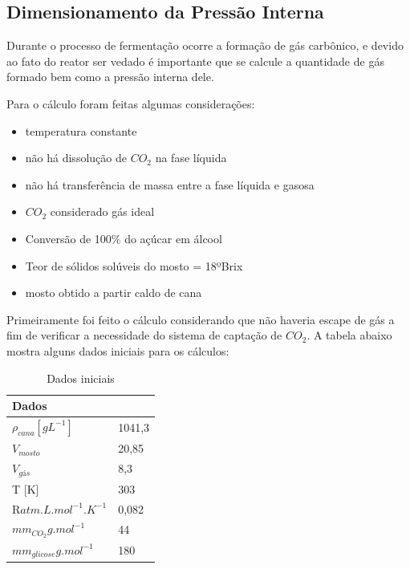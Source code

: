 \subsection{Dimensionamento da Pressão Interna}

Durante o processo de fermentação ocorre a formação de gás carbônico, e devido ao fato do reator ser vedado é importante que se calcule a quantidade de gás formado bem como a pressão interna dele.

Para o cálculo foram feitas algumas considerações:

\begin{itemize}
	\item temperatura constante
	\item não há dissolução de \(CO_{2}\) na fase líquida
	\item não há transferência de massa entre a fase líquida e gasosa
	\item \(CO_{2}\) considerado gás ideal
	\item Conversão de 100\% do açúcar em álcool
	\item Teor de sólidos solúveis do mosto = 18ºBrix
	\item mosto obtido a partir caldo de cana
\end{itemize}

Primeiramente foi feito o cálculo considerando que não haveria escape de gás a fim de verificar a necessidade do sistema de captação de \(CO_{2}\). A tabela abaixo mostra alguns dados iniciais para os cálculos:

\begin{table}[h]
\centering
\begin{tabular}{|l|l|}
\hline
\multicolumn{2}{|l|}{Dados} \\ \hline
\(\rho_{cana}[gL^{-1}]\)             &    1041,3          \\ \hline
\(V_{mosto}\)             &      20,85        \\ \hline
\(V_{gás}\)             &     8,3         \\ \hline
T [K]             &       303       \\ \hline
R\(atm.L.mol^{-1}.K^{-1}\)             &  0,082            \\ \hline
\(mm_{CO_2}g.mol^{-1}\)             &     44         \\ \hline
\(mm_{glicose}g.mol^{-1}\)         &    180          \\ \hline
\end{tabular}
\caption{Dados iniciais}
\label{dados-iniciais}
\end{table}


